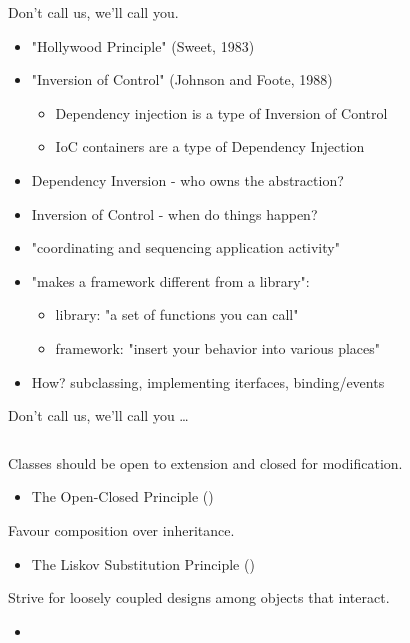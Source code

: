 \documentclass{beamer}
\begin{document}
\begin{frame}{Don't call us, we'll call you.}
    \begin{itemize}
        \item "Hollywood Principle" (Sweet, 1983)
        \item "Inversion of Control" (Johnson and Foote, 1988)
            \begin{itemize}
                \item Dependency injection is a type of Inversion of Control
                \item IoC containers are a type of Dependency Injection
            \end{itemize}
        \item Dependency Inversion - who owns the abstraction?
        \item Inversion of Control - when do things happen?
        \item "coordinating and sequencing application activity"         
        \item "makes a framework different from a library":
            \begin{itemize}
                \item library: "a set of functions you can call"
                \item framework: "insert your behavior into various places"
            \end{itemize}
        \item How? subclassing, implementing iterfaces, binding/events
    \end{itemize}
\end{frame}

\begin{frame}{Don't call us, we'll call you \ldots}
    \vspace{0cm}
    \begin{columns}
        \column{\dimexpr\paperwidth-40pt}
        
    \end{columns}
\end{frame}

\begin{frame}{Classes should be open to extension and closed for modification.}
    \begin{itemize}
        \item The Open-Closed Principle ()
    \end{itemize}
\end{frame}

\begin{frame}{Favour composition over inheritance.}
    \begin{itemize}
        \item The Liskov Substitution Principle ()
    \end{itemize}
\end{frame}

\begin{frame}{Strive for loosely coupled designs among objects that interact.}
    \begin{itemize}
        \item
    \end{itemize}
\end{frame}
\end{document}
